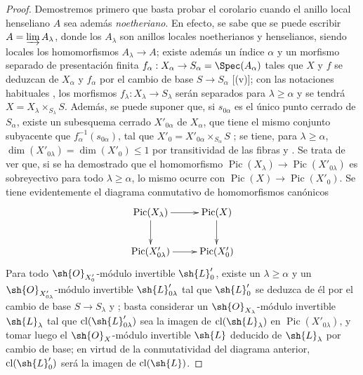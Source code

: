 \begin{proof}
Demostremos primero que basta probar el corolario cuando el anillo local henseliano $A$ sea además \emph{noetheriano}.
En efecto, se sabe  que se puede escribir $A=\varinjlim A_\lambda$, donde los $A_\lambda$ son anillos locales noetherianos y henselianos, siendo locales los homomorfismos $A_\lambda\to A$;
existe además un índice $\alpha$ y un morfismo separado de presentación finita $f_\alpha:X_\alpha\to S_\alpha=\Spec(A_\alpha)$ tales que $X$ y $f$ se deduzcan de $X_\alpha$ y $f_\alpha$ por el cambio de base $S\to S_\alpha$ [(v)];
con las notaciones habituales , los morfismos $f_\lambda:X_\lambda\to S_\lambda$ serán separados para $\lambda\geq\alpha$ y se tendrá $X=X_\lambda\times_{S_\lambda}S$.
Además, se puede suponer que, si $s_{0\alpha}$ es el único punto cerrado de $S_\alpha$, existe un subesquema cerrado $X'_{0\alpha}$ de $X_\alpha$, que tiene el mismo conjunto subyacente que $f_\alpha^{-1}(s_{0\alpha})$, tal que $X'_0=X'_{0\alpha}\times_{S_\alpha}S$ ;
se tiene, para $\lambda\geq\alpha$, $\dim(X'_{0\lambda})=\dim(X'_0)\leq1$ por transitividad de las fibras y .
Se trata de ver que, si se ha demostrado que el homomorfismo $\operatorname{Pic}(X_\lambda)\to\operatorname{Pic}(X'_{0\lambda})$ es sobreyectivo para todo $\lambda\geq\alpha$, lo mismo ocurre con $\operatorname{Pic}(X)\to\operatorname{Pic}(X'_0)$.
Se tiene evidentemente el diagrama conmutativo de homomorfismos canónicos
\[
  \xymatrix{
    \operatorname{Pic}(X_\lambda) \ar[r] \ar[d] & \operatorname{Pic}(X) \ar[d]\\
    \operatorname{Pic}(X'_{0\lambda}) \ar[r] & \operatorname{Pic}(X'_0)
  }
\]
Para todo $\sh{O}_{X'_0}$-módulo invertible $\sh{L}'_0$, existe un $\lambda\geq\alpha$ y un $\sh{O}_{X'_{0\lambda}}$-módulo invertible $\sh{L}'_{0\lambda}$ tal que $\sh{L}'_0$ se deduzca de él por el cambio de base $S\to S_\lambda$  y ;
basta considerar un $\sh{O}_{X_\lambda}$-módulo invertible $\sh{L}_\lambda$ tal que $\operatorname{cl}(\sh{L}'_{0\lambda})$ sea la imagen de $\operatorname{cl}(\sh{L}_\lambda)$ en $\operatorname{Pic}(X'_{0\lambda})$, y tomar luego el $\sh{O}_X$-módulo invertible $\sh{L}$ deducido de $\sh{L}_\lambda$ por cambio de base;
en virtud de la conmutatividad del diagrama anterior, $\operatorname{cl}(\sh{L}'_0)$ será la imagen de $\operatorname{cl}(\sh{L})$.


\end{proof}
